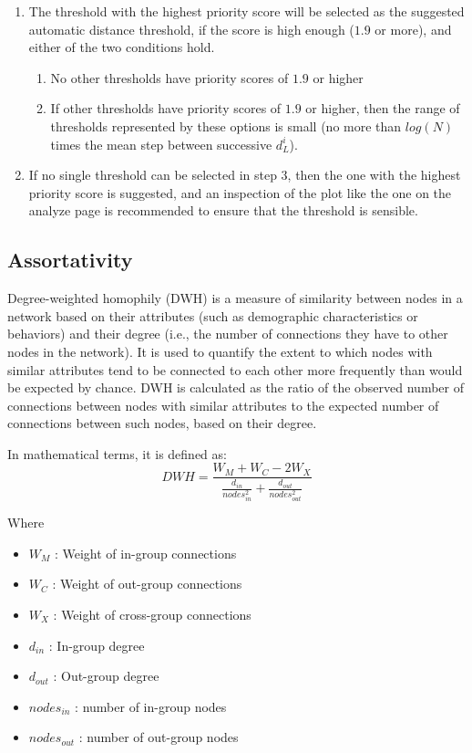\documentclass[utf8]{FrontiersinHarvard} %
\begin{document}
\begin{enumerate}
  \item{The threshold with the highest priority score will be selected as the suggested automatic distance threshold, if the score is high enough ($1.9$ or more), and either of the two conditions hold.
    \begin{enumerate}
      \item{No other thresholds have priority scores of $1.9$ or higher}
      \item{If other thresholds have priority scores of $1.9$ or higher, then the range of thresholds represented by these options is small (no more than $log(N)$ times the mean step between successive $d_L^i$).}
    \end{enumerate}}

 \item{If no single threshold can be selected in step 3, then the one with the highest priority score is suggested, and an inspection of the plot like the one on the analyze page is recommended to ensure that the threshold is sensible.}
\end{enumerate}

\subsection{Assortativity}

Degree-weighted homophily (DWH) is a measure of similarity between nodes in a network based on their attributes (such as demographic characteristics or behaviors) and their degree (i.e., the number of connections they have to other nodes in the network). It is used to quantify the extent to which nodes with similar attributes tend to be connected to each other more frequently than would be expected by chance.
DWH is calculated as the ratio of the observed number of connections between nodes with similar attributes to the expected number of connections between such nodes, based on their degree.

In mathematical terms, it is defined as:
\begin{equation}
  DWH = \frac{W_M + W_C - 2W_X}{\frac{d_{in}}{nodes_{in}^2} + \frac{d_{out}}{nodes_{out}^2}}
\end{equation}

Where
\begin{itemize}
  \item{$W_M$ : Weight of in-group connections}
  \item{$W_C$ : Weight of out-group connections}
  \item{$W_X$ : Weight of cross-group connections}
  \item{$d_{in}$ : In-group degree}
  \item{$d_{out}$ : Out-group degree}
  \item{$nodes_{in}$ : number of in-group nodes}
  \item{$nodes_{out}$ : number of out-group nodes}
\end{itemize}
\end{document}
